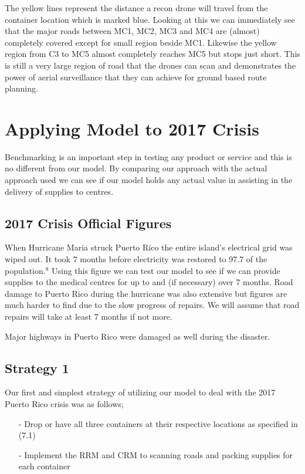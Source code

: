 \documentclass[a4paper,12pt]{article}
\begin{document}
The yellow lines represent the distance a recon drone will travel from the container location which is marked blue. Looking at this we can immediately see that the major roads
between MC1, MC2, MC3 and MC4 are (almost) completely covered except for small region beside MC1.
Likewise the yellow region from C3 to MC5 almost completely reaches MC5 but stops just short. This is still a very large region of road that the drones can scan
and demonstrates the power of aerial surveillance that they can achieve for ground based route planning.


\newpage

\section{Applying Model to 2017 Crisis}
Benchmarking is an important step in testing any product or service and this is no different from our model. By comparing our approach with the actual approach used we can see if our model holds any actual value in assisting
in the delivery of supplies to centres.

\subsection{2017 Crisis Official Figures}
When Hurricane Maria struck Puerto Rico the entire island's electrical grid was wiped out. It took 7 months before electricity was restored to 97.7 %
of the population.$^8$ Using this figure we can test our model to see if we can provide supplies to the medical centres for up to and (if necessary) over 7 months.
Road damage to Puerto Rico during the hurricane was also extensive but figures are much harder to find due to the slow progress of repairs. We will assume that road repairs will take at
least 7 months if not more.

Major highways in Puerto Rico were damaged as well during the disaster.

\subsection{Strategy 1}
Our first and simplest strategy of utilizing our model to deal with the 2017 Puerto Rico crisis was as follows;

\begin{itemize}
\item[-]Drop or have all three containers at their respective locations as specified in (7.1)
\item[-]Implement the RRM and CRM to scanning roads and packing supplies for each container
\end{itemize}
\end{document}
